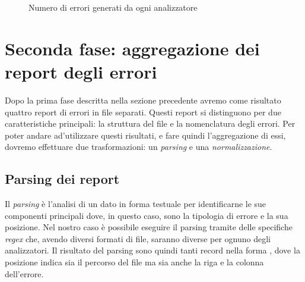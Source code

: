     \begin{figure}
      \centering
      \caption{Numero di errori generati da ogni analizzatore}
      \label{fig:grafo_errori_generati}
  \end{figure}


\section{Seconda fase: aggregazione dei report degli errori}
Dopo la prima fase descritta nella sezione precedente avremo come risultato quattro report di errori in file separati. Questi report si distinguono per due caratteristiche principali: la struttura del file e la nomenclatura degli errori. 
Per poter andare ad'utilizzare questi risultati, e fare quindi l'aggregazione di essi, dovremo effettuare due trasformazioni: un \textit{parsing} e una \textit{normalizzazione}.


\subsection{Parsing dei report}
Il \textit{parsing} è l'analisi di un dato in forma testuale per identificarne le sue componenti principali dove, in questo caso, sono la tipologia di errore e la sua posizione. 
Nel nostro caso è possibile eseguire il parsing tramite delle specifiche \textit{regex} che, avendo diversi formati di file, saranno diverse per ognuno degli analizzatori.
Il risultato del parsing sono quindi tanti record nella forma , dove la posizione indica sia il percorso del file ma sia anche la riga e la colonna dell'errore.

